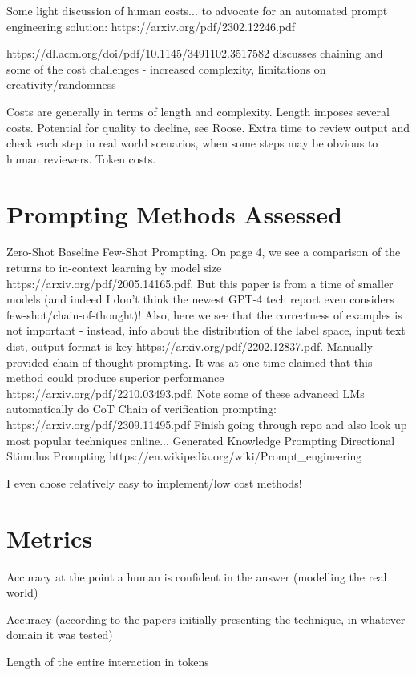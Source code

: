 \documentclass[11pt]{article}
\begin{document}
Some light discussion of human costs... to advocate for an automated prompt engineering solution: https://arxiv.org/pdf/2302.12246.pdf

https://dl.acm.org/doi/pdf/10.1145/3491102.3517582 discusses chaining and some of the cost challenges - increased complexity, limitations on creativity/randomness

Costs are generally in terms of length and complexity.
Length imposes several costs. Potential for quality to decline, see Roose. Extra time to review output and check each step in real world scenarios, when some steps may be obvious to human reviewers. Token costs.

\section{Prompting Methods Assessed}

Zero-Shot Baseline
Few-Shot Prompting. On page 4, we see a comparison of the returns to in-context learning by model size https://arxiv.org/pdf/2005.14165.pdf. But this paper is from a time of smaller models (and indeed I don't think the newest GPT-4 tech report even considers few-shot/chain-of-thought)! Also, here we see that the correctness of examples is not important - instead, info about the distribution of the label space, input text dist, output format is key https://arxiv.org/pdf/2202.12837.pdf.
Manually provided chain-of-thought prompting. It was at one time claimed that this method could produce superior performance https://arxiv.org/pdf/2210.03493.pdf. Note some of these advanced LMs automatically do CoT
Chain of verification prompting: https://arxiv.org/pdf/2309.11495.pdf
Finish going through repo and also look up most popular techniques online...
Generated Knowledge Prompting
Directional Stimulus Prompting
https://en.wikipedia.org/wiki/Prompt_engineering

I even chose relatively easy to implement/low cost methods!

\section{Metrics}

Accuracy at the point a human is confident in the answer (modelling the real world)

Accuracy (according to the papers initially presenting the technique, in whatever domain it was tested)

Length of the entire interaction in tokens
\end{document}
